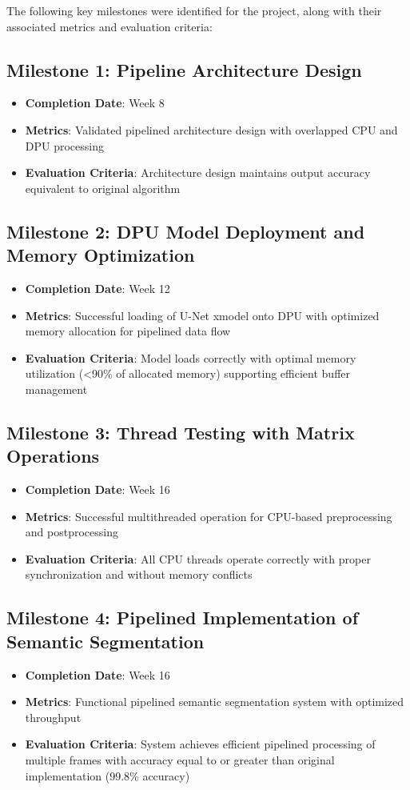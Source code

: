The following key milestones were identified for the project, along with their associated metrics and evaluation criteria:

\subsection{Milestone 1: Pipeline Architecture Design}
\begin{itemize}
\item \textbf{Completion Date}: Week 8
\item \textbf{Metrics}: Validated pipelined architecture design with overlapped CPU and DPU processing
\item \textbf{Evaluation Criteria}: Architecture design maintains output accuracy equivalent to original algorithm
\end{itemize}

\subsection{Milestone 2: DPU Model Deployment and Memory Optimization}
\begin{itemize}
\item \textbf{Completion Date}: Week 12
\item \textbf{Metrics}: Successful loading of U-Net xmodel onto DPU with optimized memory allocation for pipelined data flow
\item \textbf{Evaluation Criteria}: Model loads correctly with optimal memory utilization (<90\% of allocated memory) supporting efficient buffer management
\end{itemize}

\subsection{Milestone 3: Thread Testing with Matrix Operations}
\begin{itemize}
\item \textbf{Completion Date}: Week 16
\item \textbf{Metrics}: Successful multithreaded operation for CPU-based preprocessing and postprocessing
\item \textbf{Evaluation Criteria}: All CPU threads operate correctly with proper synchronization and without memory conflicts
\end{itemize}

\subsection{Milestone 4: Pipelined Implementation of Semantic Segmentation}
\begin{itemize}
\item \textbf{Completion Date}: Week 16
\item \textbf{Metrics}: Functional pipelined semantic segmentation system with optimized throughput
\item \textbf{Evaluation Criteria}: System achieves efficient pipelined processing of multiple frames with accuracy equal to or greater than original implementation (99.8\% accuracy)
\end{itemize}

